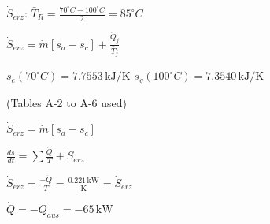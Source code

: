 \( \dot{S}_{erz} \):  
\( \bar{T}_R = \frac{70^\circ C + 100^\circ C}{2} = 85^\circ C \)  

\( \dot{S}_{erz} = \dot{m} \left[ s_a - s_c \right] + \frac{\dot{Q}_j}{\bar{T}_j} \)  

\( s_e (70^\circ C) = 7.7553 \, \text{kJ/K} \)  
\( s_g (100^\circ C) = 7.3540 \, \text{kJ/K} \)  

(Tables A-2 to A-6 used)  

\( \dot{S}_{erz} = \dot{m} \left[ s_a - s_c \right] \)  

\( \frac{ds}{dt} = \sum \frac{\dot{Q}}{T} + \dot{S}_{erz} \)  

\( \dot{S}_{erz} = \frac{-\dot{Q}}{T} = \frac{0.221 \, \text{kW}}{\text{K}} = \dot{S}_{erz} \)  

\( \dot{Q} = -Q_{aus} = -65 \, \text{kW} \)